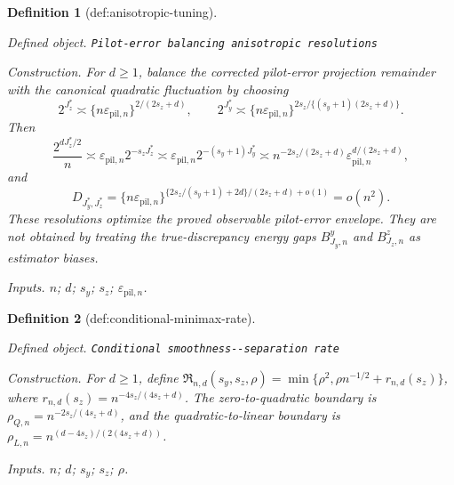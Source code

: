 \documentclass{article}
\newtheorem{definition}{Definition}
\begin{document}
\begin{definition}[def:anisotropic-tuning]\label{def:anisotropic-tuning}
\par\smallskip\noindent\emph{Defined object.} \texttt{Pilot-\allowbreak{}error balancing anisotropic resolutions}
\par\smallskip\noindent\emph{Construction.} For \(d\ge1\), balance the corrected pilot-error projection remainder with the canonical quadratic fluctuation by choosing
\[
2^{J_z^*}\asymp\{n\varepsilon_{\mathrm{pil},n}\}^{2/(2s_z+d)},
\qquad
2^{J_y^*}\asymp
\{n\varepsilon_{\mathrm{pil},n}\}^{2s_z/\{(s_y+1)(2s_z+d)\}}.
\]
Then
\[
\frac{2^{dJ_z^*/2}}n
\asymp
\varepsilon_{\mathrm{pil},n}2^{-s_zJ_z^*}
\asymp
\varepsilon_{\mathrm{pil},n}2^{-(s_y+1)J_y^*}
\asymp
n^{-2s_z/(2s_z+d)}
\varepsilon_{\mathrm{pil},n}^{d/(2s_z+d)},
\]
and
\[
D_{J_y^*,J_z^*}
=\{n\varepsilon_{\mathrm{pil},n}\}^{\{2s_z/(s_y+1)+2d\}/(2s_z+d)+o(1)}
=o(n^2).
\]
These resolutions optimize the proved observable pilot-error envelope.  They are not obtained by treating the true-discrepancy energy gaps \(B^y_{J_y,n}\) and \(B^z_{J_z,n}\) as estimator biases.
\par\smallskip\noindent\emph{Inputs.} \(n\); \(d\); \(s_y\); \(s_z\); \(\varepsilon_{\mathrm{pil},n}\).
\end{definition}

\begin{definition}[def:conditional-minimax-rate]\label{def:conditional-minimax-rate}
\par\smallskip\noindent\emph{Defined object.} \texttt{Conditional smoothness-\allowbreak{}-\allowbreak{}separation rate}
\par\smallskip\noindent\emph{Construction.} For \(d\ge1\), define \(\mathfrak R_{n,d}(s_y,s_z,\rho)=\min\{\rho^2,\rho n^{-1/2}+r_{n,d}(s_z)\}\), where \(r_{n,d}(s_z)=n^{-4s_z/(4s_z+d)}\). The zero-to-quadratic boundary is \(\rho_{Q,n}=n^{-2s_z/(4s_z+d)}\), and the quadratic-to-linear boundary is \(\rho_{L,n}=n^{(d-4s_z)/(2(4s_z+d))}\).
\par\smallskip\noindent\emph{Inputs.} \(n\); \(d\); \(s_y\); \(s_z\); \(\rho\).
\end{definition}
\end{document}
